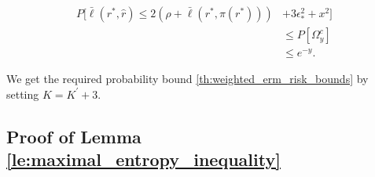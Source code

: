\documentclass[letterpaper]{article} %
\def\DoubleColumn{}
\def\DoubleColumnEnd{}
\def\SingleColumnEnd{}
\newcommand{\Pro}{P}
\newcommand{\relossf}{\bar{\ell}}
\begin{document}
    \SingleColumnEnd
    \DoubleColumn
        \begin{align*}
            \label{eq:risk_bounds_convert}
            \Pro[\relossf(r^*,\hat{r})\le 2(\rho+\relossf(r^*,\pi(r^*)))&+3\epsilon_*^2+x^2]\\
            &\le \Pro[\Omega_y^c]\\
            &\le e^{-y}.
        \end{align*}
    \DoubleColumnEnd
    We get the required probability bound \eqref{th:weighted_erm_risk_bounds} by setting $K=K^\prime+3$.

\subsection{Proof of Lemma \ref{le:maximal_entropy_inequality}} %
\label{sub:proof_of_lemma_le:maximal_entropy_inequality}
\end{document}
